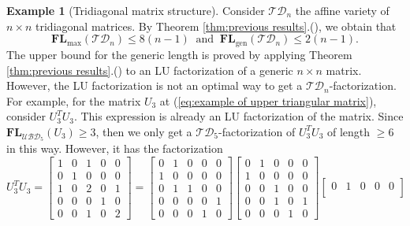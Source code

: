 \documentclass[reqno]{amsart}
\theoremstyle{definition}
\newtheorem{example}[theorem]{Example}
\numberwithin{equation}{section}
\begin{document}
\begin{example}[Tridiagonal matrix structure]
    Consider $\mathcal{TD}_n$ the affine variety of $n \times n$ tridiagonal matrices. By Theorem \ref{thm:previous results}.(), we obtain that
    \begin{equation*}
        \mathbf{FL}_{\text{max}}(\mathcal{TD}_n)\leq 8(n-1)~\text{ and }~\mathbf{FL}_{\text{gen}}(\mathcal{TD}_n) \leq 2(n-1).
    \end{equation*}
    The upper bound for the generic length is proved by applying Theorem \ref{thm:previous results}.() to an LU factorization of a generic $n \times n$ matrix. However, the LU factorization is not an optimal way to get a $\mathcal{TD}_n$-factorization. For example, for the matrix $U_3$ at (\ref{eq:example of upper triangular matrix}), consider $U_3^TU_3$. This expression is already an LU factorization of the matrix. Since $\mathbf{FL}_{\mathcal{UBD}_5}(U_3)\geq 3$, then we only get a $\mathcal{TD}_5$-factorization of $U_3^TU_3$ of length $\geq 6$ in this way. However, it has the factorization
    \begin{equation*}
        U_3^TU_3=\begin{bmatrix}
            1 & 0 & 1 & 0 & 0\\
            0 & 1 & 0 & 0 & 0\\
            1 & 0 & 2 & 0 & 1\\
            0 & 0 & 0 & 1 & 0\\
            0 & 0 & 1 & 0 & 2
        \end{bmatrix}=\begin{bmatrix}
            0 & 1 & 0 & 0 & 0\\
            1 & 0 & 0 & 0 & 0\\
            0 & 1 & 1 & 0 & 0\\
            0 & 0 & 0 & 0 & 1\\
            0 & 0 & 0 & 1 & 0
        \end{bmatrix}\begin{bmatrix}
            0 & 1 & 0 & 0 & 0\\
            1 & 0 & 0 & 0 & 0\\
            0 & 0 & 1 & 0 & 0\\
            0 & 0 & 1 & 0 & 1\\
            0 & 0 & 0 & 1 & 0
        \end{bmatrix}\begin{bmatrix}
            0 & 1 & 0 & 0 & 0\\

\end{bmatrix}
\end{equation*}
\end{example}
\end{document}
